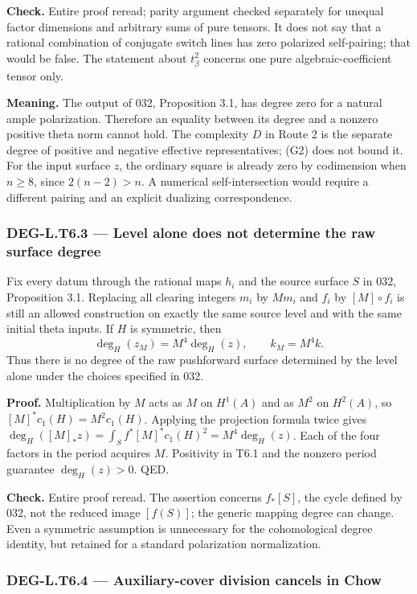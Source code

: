 \documentclass[11pt,a4paper]{article}
\theoremstyle{definition}
\begin{document}
\textbf{Check.} Entire proof reread; parity argument checked separately for unequal factor dimensions and arbitrary sums of pure tensors. It does not say that a rational combination of conjugate switch lines has zero polarized self-pairing; that would be false. The statement about \(t_\beta^2\) concerns one pure algebraic-coefficient tensor only.

\textbf{Meaning.} The output of 032, Proposition 3.1, has degree zero for a natural ample polarization. Therefore an equality between its degree and a nonzero positive theta norm cannot hold. The complexity \(D\) in Route 2 is the separate degree of positive and negative effective representatives; (G2) does not bound it. For the input surface \(z\), the ordinary square is already zero by codimension when \(n\ge8\), since \(2(n-2)>n\). A numerical self-intersection would require a different pairing and an explicit dualizing correspondence.

\subsubsection{DEG-L.T6.3 --- Level alone does not determine the raw surface degree}\label{DEG-L.T6.3}

Fix every datum through the rational maps \(h_i\) and the source surface \(S\) in 032, Proposition 3.1. Replacing all clearing integers \(m_i\) by \(Mm_i\) and \(f_i\) by \([M]\circ f_i\) is still an allowed construction on exactly the same source level and with the same initial theta inputs. If \(H\) is symmetric, then \[
\deg_H(z_M)=M^4\deg_H(z),\qquad k_M=M^4k.
\tag{G3}
\] Thus there is no degree of the raw pushforward surface determined by the level alone under the choices specified in 032.

\textbf{Proof.} Multiplication by \(M\) acts as \(M\) on \(H^1(A)\) and as \(M^2\) on \(H^2(A)\), so \([M]^*c_1(H)=M^2c_1(H)\). Applying the projection formula twice gives \(\deg_H([M]_*z)=\int_S f^*[M]^*c_1(H)^2=M^4\deg_H(z)\). Each of the four factors in the period acquires \(M\). Positivity in T6.1 and the nonzero period guarantee \(\deg_H(z)>0\). QED.

\textbf{Check.} Entire proof reread. The assertion concerns \(f_*[S]\), the cycle defined by 032, not the reduced image \([f(S)]\); the generic mapping degree can change. Even a symmetric assumption is unnecessary for the cohomological degree identity, but retained for a standard polarization normalization.

\subsubsection{DEG-L.T6.4 --- Auxiliary-cover division cancels in Chow}\label{DEG-L.T6.4}
\end{document}
